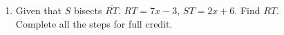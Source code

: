 \documentclass[12pt, twoside]{article}
\begin{document}
\begin{enumerate}
\vspace{4cm}

\item Given that $S$ bisects $\overline{RT}$. $RT=7x-3$, $ST=2x+6$. Find ${RT}$.\\
Complete all the steps for full credit.

\end{enumerate}
\end{document}
